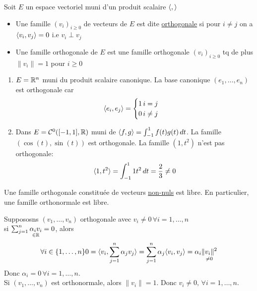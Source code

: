 \begin{definition}
    Soit $E$ un espace vectoriel muni d'un produit scalaire  $\langle , \rangle$
     \begin{itemize}
         \item Une famille $(v_i)_{i \ge 0}$ de vecteurs de $E$ est dite \underline{orthogonale} si pour $i \neq j$ on a $\langle v_i, v_j \rangle = 0$ i.e  $v_i \perp v_j$
         \item Une famille orthogonale de  $E$ est une famille orthogonale  $(v_i)_{i \ge  0}$ tq de plus $\|v_i\| = 1$ pour  $i \ge 0$
    \end{itemize}
\end{definition}
\begin{eg}
   \begin{enumerate}
       \item $E = \mathbb{R}^{n}$ muni du produit scalaire canonique. La base canonique $(e_1, \ldots, e_n)$ est orthogonale car 
           \[
           \langle e_i, e_j \rangle = \begin{cases}
               1 \, i = j\\
               0 \, i \neq j
           \end{cases}
           \] 
       \item Dans $E = \mathcal{C}^{0}([-1, 1], \mathbb{R})$ muni de $\langle f,g \rangle = \int_{-1}^{1} f(t)g(t)\,d{t}$. La famille $(\cos(t), \sin(t))$ est orthogonale. La famille $(1, t^2)$ n'est pas orthogonale:
            \[
                \langle 1, t^2 \rangle = \int_{-1}^{1} 1 t^2 \, d{t} = \frac{2}{3} \neq  0 
           \] 
   \end{enumerate} 
\end{eg}
\begin{prop}
    Une famille orthogonale constituée de vecteurs \underline{non-nuls} est libre. En particulier, une famille orthonormale est libre. 
\end{prop}
\begin{preuve}
    Suppososns $(v_1, \ldots, v_n)$ orthogonale avec $v_i \neq 0 \, \forall i = 1, \ldots, n$\\
    si $\sum_{j=1}^{n} \underset{\in \mathbb{R}}{\alpha_iv_i} = 0$, alors  
    \[
        \forall i \in \{1, \ldots, n\} 0 = \langle v_i, \sum_{j=1}^{n} \alpha_jv_j \rangle = \sum_{j=1}^{n}\alpha_j \langle v_i, v_j \rangle = \alpha_i \underset{\neq 0}{\|v_i\|^2}
    \] 
    Donc $\alpha_i = 0 \, \forall i = 1, \ldots, n$.\\
    Si $(v_1, \ldots, v_n)$ est orthonormale, alors $\|v_i\| = 1$. Donc  $v_i \neq 0, \, \forall i = 1, \ldots, n$.
\end{preuve}
